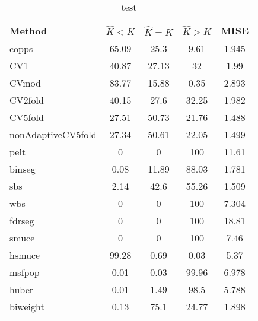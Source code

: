 \begin{table}[ht]
\centering
\begin{tabular}{l|cccc}
  \hline
Method & $\hat{K} < K$ & $\hat{K} = K$ & $\hat{K} > K$ & MISE \\ 
  \hline
copps & 65.09 &  25.3 &  9.61 & 1.945 \\ 
  CV1 & 40.87 & 27.13 &    32 &  1.99 \\ 
  CVmod & 83.77 & 15.88 &  0.35 & 2.893 \\ 
  CV2fold & 40.15 &  27.6 & 32.25 & 1.982 \\ 
  CV5fold & 27.51 & 50.73 & 21.76 & 1.488 \\ 
  nonAdaptiveCV5fold & 27.34 & 50.61 & 22.05 & 1.499 \\ 
  pelt &     0 &     0 &   100 & 11.61 \\ 
  binseg &  0.08 & 11.89 & 88.03 & 1.781 \\ 
  sbs &  2.14 &  42.6 & 55.26 & 1.509 \\ 
  wbs &     0 &     0 &   100 & 7.304 \\ 
  fdrseg &     0 &     0 &   100 & 18.81 \\ 
  smuce &     0 &     0 &   100 &  7.46 \\ 
  hsmuce & 99.28 &  0.69 &  0.03 &  5.37 \\ 
  msfpop &  0.01 &  0.03 & 99.96 & 6.978 \\ 
  huber &  0.01 &  1.49 &  98.5 & 5.788 \\ 
  biweight &  0.13 &  75.1 & 24.77 & 1.898 \\ 
   \hline
\end{tabular}
\caption{test} 
\end{table}
